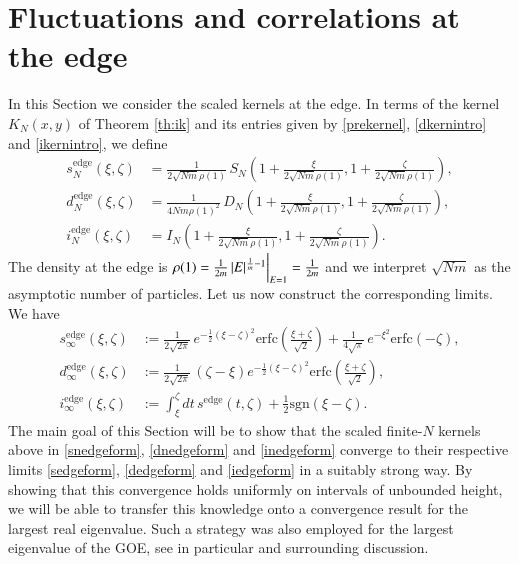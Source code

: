 \documentclass[11pt,reqno]{amsproc}
\numberwithin{equation}{section}
\numberwithin{theorem}{section}
\begin{document}
\section{Fluctuations and correlations at the edge}
\label{se:edge}
In this Section we consider the scaled kernels at the edge. In terms of the kernel $K_{N}(x,y)$ of Theorem \ref{th:ik} and its entries given by \eqref{prekernel}, \eqref{dkernintro} and \eqref{ikernintro}, we define
\begin{align}
s^{\mathrm{edge}}_{N}(\xi,\zeta) &= \frac{1}{2\sqrt{Nm}\rho(1)}\,S_{N}\left(1+\frac{\xi}{2\sqrt{Nm}\rho(1)},1+\frac{\zeta}{2\sqrt{Nm}\rho(1)}\right), \label{snedgeform}\\
d^{\mathrm{edge}}_{N}(\xi,\zeta) &= \frac{1}{4Nm\rho(1)^{2}}\,D_{N}\left(1+\frac{\xi}{2\sqrt{Nm}\rho(1)},1+\frac{\zeta}{2\sqrt{Nm}\rho(1)}\right), \label{dnedgeform}\\
i^{\mathrm{edge}}_{N}(\xi,\zeta) &= I_{N}\left(1+\frac{\xi}{2\sqrt{Nm}\rho(1)},1+\frac{\zeta}{2\sqrt{Nm}\rho(1)}\right).\label{inedgeform}
\end{align}
The density at the edge is $\rho(1) = \frac{1}{2m}\,|E|^{\frac{1}{m}-1}\bigg{|}_{E=1} = \frac{1}{2m}$ and we interpret $\sqrt{Nm}$ as the asymptotic number of particles. Let us now construct the corresponding limits. We have
\begin{align}
s_{\infty}^{\mathrm{edge}}(\xi,\zeta) &:= \frac{1}{2\sqrt{2\pi}}\,e^{-\frac{1}{2}(\xi-\zeta)^{2}}\mathrm{erfc}\left(\frac{\xi+\zeta}{\sqrt{2}}\right)+\frac{1}{4\sqrt{\pi}}\,e^{-\xi^{2}}\mathrm{erfc}(-\zeta), \label{sedgeform}\\
d_{\infty}^{\mathrm{edge}}(\xi,\zeta) &:= \frac{1}{2\sqrt{2\pi}}\,(\zeta-\xi)e^{-\frac{1}{2}(\xi-\zeta)^{2}}\mathrm{erfc}\left(\frac{\xi+\zeta}{\sqrt{2}}\right), \label{dedgeform}\\
i_{\infty}^{\mathrm{edge}}(\xi,\zeta) &:= \int_{\xi}^{\zeta}dt\,s^{\mathrm{edge}}(t,\zeta) + \frac{1}{2}\mathrm{sgn}(\xi-\zeta). \label{iedgeform}
\end{align}
The main goal of this Section will be to show that the scaled finite-$N$ kernels above in \eqref{snedgeform}, \eqref{dnedgeform} and \eqref{inedgeform} converge to their respective limits \eqref{sedgeform}, \eqref{dedgeform} and \eqref{iedgeform} in a suitably strong way. By showing that this convergence holds uniformly on intervals of unbounded height, we will be able to transfer this knowledge onto a convergence result for the largest real eigenvalue. Such a strategy was also employed for the largest eigenvalue of the GOE, see in particular \cite[Theorem 3.9.24]{AGZ10} and surrounding discussion.
\end{document}
